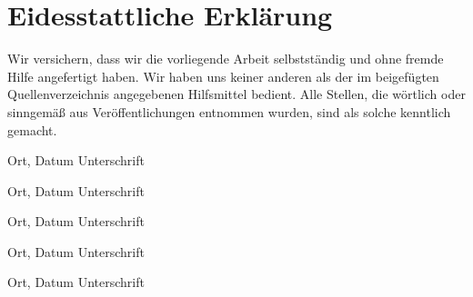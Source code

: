 \chapter*{Eidesstattliche Erklärung}
Wir versichern, dass wir die vorliegende Arbeit selbstständig und ohne fremde Hilfe angefertigt haben. Wir haben uns keiner anderen als der im beigefügten Quellenverzeichnis angegebenen Hilfsmittel bedient. Alle Stellen, die wörtlich oder sinngemäß aus Veröffentlichungen entnommen wurden, sind als solche kenntlich gemacht.

\vspace{0.5cm}

{}
{ 	\daschuelereins 

	\vspace{1cm}
	
	\hspace{1.5cm} Ort, Datum \hfill Unterschrift \hspace{1.5cm}}

{}
{ 	\daschuelerzwei 
	
	\vspace{1cm}
	
	\hspace{1.5cm} Ort, Datum \hfill Unterschrift \hspace{1.5cm}}

{}
{ 	\daschuelerdrei 
	
	\vspace{1cm}
	
	\hspace{1.5cm} Ort, Datum \hfill Unterschrift \hspace{1.5cm}}

{}
{ 	\daschuelervier 
	
	\vspace{1cm}
	
	\hspace{1.5cm} Ort, Datum \hfill Unterschrift \hspace{1.5cm}}

{}
{ 	\daschuelerfuenf 
	
	\vspace{1cm}
	
	\hspace{1.5cm} Ort, Datum \hfill Unterschrift \hspace{1.5cm}}




